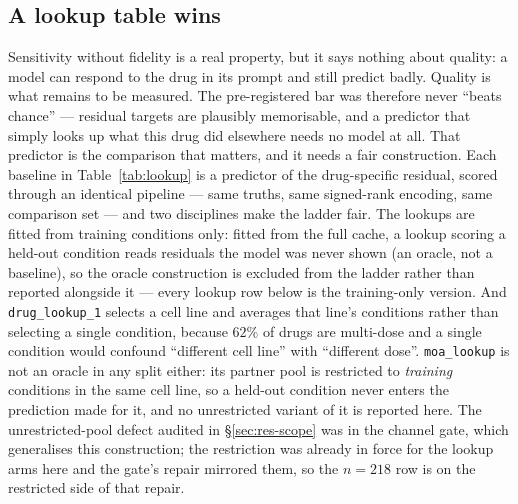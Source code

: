 \subsection{A lookup table wins}
\label{sec:methods-baselines}
\label{sec:res-lookup}

Sensitivity without fidelity is a real property, but it says nothing about quality: a model can
respond to the drug in its prompt and still predict badly. Quality is what remains to be
measured. The pre-registered bar was therefore
never ``beats chance'' --- residual targets are plausibly memorisable, and a predictor that simply
looks up what this drug did elsewhere needs no model at all. That predictor is the comparison that
matters, and it needs a fair construction. Each baseline in Table~\ref{tab:lookup} is a predictor of
the drug-specific residual, scored through an identical pipeline --- same truths, same signed-rank
encoding, same comparison set --- and two disciplines make the ladder fair. The lookups are fitted
from training conditions only: fitted from the full cache, a lookup scoring a held-out condition
reads residuals the model was never shown (an oracle, not a baseline), so the oracle construction is
excluded from the ladder rather than reported alongside it --- every lookup row below is the
training-only version. And \texttt{drug\_lookup\_1} selects a cell line and averages that line's
conditions rather than selecting a single condition, because $62\%$ of drugs are multi-dose and a
single condition would confound ``different cell line'' with ``different dose''.
\texttt{moa\_lookup} is not an oracle in any split either: its partner pool is restricted to
\emph{training} conditions in the same cell line, so a held-out condition never enters the
prediction made for it, and no unrestricted variant of it is reported here. The unrestricted-pool
defect audited in \S\ref{sec:res-scope} was in the channel gate, which generalises this
construction; the restriction was already in force for the lookup arms here and the gate's repair
mirrored them, so the $n = 218$ row is on the restricted side of that repair.

